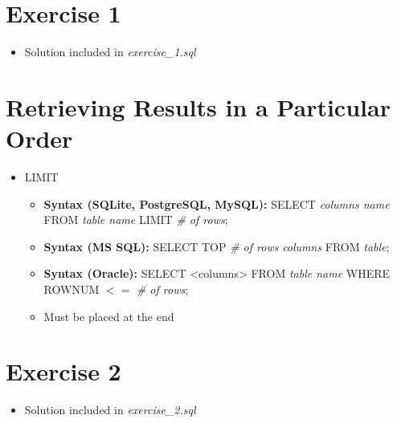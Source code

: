 \documentclass[12pt]{article}
\begin{document}
\bigskip

\section{Exercise 1}

\bigskip

\begin{itemize}
    \item Solution included in \textit{exercise\_1.sql}
\end{itemize}

\bigskip

\section{Retrieving Results in a Particular Order}

\bigskip

\begin{itemize}
    \item LIMIT
    \begin{itemize}
        \item \textbf{Syntax (SQLite, PostgreSQL, MySQL):} SELECT \textit{columns name} FROM \textit{table name} LIMIT \textit{\# of rows};
        \item \textbf{Syntax (MS SQL):} SELECT TOP \textit{\# of rows} \textit{columns} FROM \textit{table};
        \item \textbf{Syntax (Oracle):} SELECT <columns> FROM \textit{table name} WHERE ROWNUM $<=$ \textit{\# of rows};
        \item Must be placed at the end
    \end{itemize}
\end{itemize}

\bigskip

\section{Exercise 2}

\bigskip

\begin{itemize}
    \item Solution included in \textit{exercise\_2.sql}
\end{itemize}

\bigskip
\end{document}
